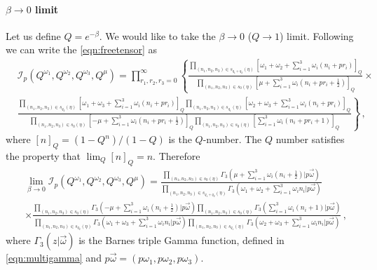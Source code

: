 \documentclass[main.tex]{subfiles}
\begin{document}
\paragraph{$\beta\to0$ limit}
Let us define $Q=e^{-\beta}$. We would like to take the $\beta\to0$ ($Q\to1$) limit. Following \cite{Gadde:2011ia,Dolan:2011rp} we can write the \eqref{eqn:freetensor} as
\begin{equation}
\begin{aligned}
&\mathcal{I}_{p}\left(Q^{\omega_1},Q^{\omega_2},Q^{\omega_3},Q^{\mu}\right)=\prod_{r_1,r_2,r_3=0}^{\infty}\left\{\frac{\prod\limits_{(n_1,n_2,n_3)\in s_{q_1+q_2}(\eta)}\left[\omega_1+\omega_2+\sum_{i=1}^3\omega_i(n_i+pr_i)\right]_Q}{\prod\limits_{(n_1,n_2,n_3)\in s_0(\eta)}\left[\mu+\sum_{i=1}^3\omega_i(n_i+pr_i+\frac{1}{2})\right]_Q}\times\right.\\
&\left.\frac{\prod\limits_{(n_1,n_2,n_3)\in s_{q_2}(\eta)}\left[\omega_1+\omega_3+\sum_{i=1}^3\omega_i(n_i+pr_i)\right]_Q\prod\limits_{(n_1,n_2,n_3)\in s_{q_1}(\eta)}\left[\omega_2+\omega_3+\sum_{i=1}^3\omega_i(n_i+pr_i)\right]_Q}{\prod\limits_{(n_1,n_2,n_3)\in s_0(\eta)}\left[-\mu+\sum_{i=1}^3\omega_i(n_i+pr_i+\frac{1}{2})\right]_Q\prod\limits_{(n_1,n_2,n_3)\in s_0(\eta)}\left[\sum_{i=1}^3\omega_i(n_i+pr_i+1)\right]_Q}\right\}\,,
\end{aligned}
\end{equation}
where $\left[n\right]_Q=(1-Q^n)/(1-Q)$ is the $Q$-number. The $Q$ number satisfies the property that $\lim_{Q}[n]_Q=n$.
Therefore
\begin{equation}
\begin{aligned}
&\lim_{\beta\to0}\mathcal{I}_{p}\left(Q^{\omega_1},Q^{\omega_2},Q^{\omega_3},Q^{\mu}\right)=\frac{\prod\limits_{(n_1,n_2,n_3)\in s_0(\eta)}\Gamma_3\left(\mu+\sum_{i=1}^3\omega_i(n_i+\frac{1}{2})|p\vec{\omega}\right)}{\prod\limits_{(n_1,n_2,n_3)\in s_{q_1+q_2}(\eta)}\Gamma_3\left(\omega_1+\omega_2+\sum_{i=1}^3\omega_in_i|p\vec{\omega}\right)}\\
&\times\frac{\prod\limits_{(n_1,n_2,n_3)\in s_0(\eta)}\Gamma_3\left(-\mu+\sum_{i=1}^3\omega_i(n_i+\frac{1}{2})|p\vec{\omega}\right)\prod\limits_{(n_1,n_2,n_3)\in s_0(\eta)}\Gamma_3\left(\sum_{i=1}^3\omega_i(n_i+1)|p\vec{\omega}\right)}{\prod\limits_{(n_1,n_2,n_3)\in s_{q_2}(\eta)}\Gamma_3\left(\omega_1+\omega_3+\sum_{i=1}^3\omega_in_i|p\vec{\omega}\right)\prod\limits_{(n_1,n_2,n_3)\in s_{q_1}(\eta)}\Gamma_3\left(\omega_2+\omega_3+\sum_{i=1}^3\omega_in_i|p\vec{\omega}\right)}\,,
\end{aligned}
\end{equation}
where $\Gamma_3(z|\vec{\omega})$ is the Barnes triple Gamma function, defined in \eqref{eqn:multigamma} and $p\vec{\omega}=(p\omega_1,p\omega_2,p\omega_3)$.
\end{document}
